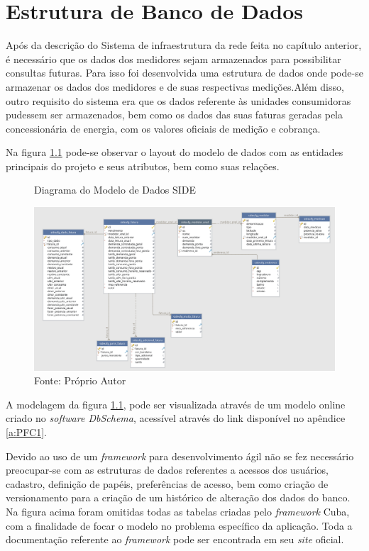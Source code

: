 \chapter{Estrutura de Banco de Dados}
\label{c:estrutura_de_banco_de_dados}
Após da descrição do Sistema de infraestrutura da rede feita no capítulo anterior, é necessário que os dados dos medidores sejam armazenados para possibilitar consultas futuras. Para isso foi desenvolvida uma estrutura de dados onde pode-se armazenar os dados dos medidores e de suas respectivas medições.Além disso, outro requisito do sistema era que os dados referente às unidades consumidoras pudessem ser armazenados, bem como os dados das suas faturas geradas pela concessionária de energia, com os valores oficiais de medição e cobrança.

Na figura \ref{fig:diagrama-modelo-dados} pode-se observar o layout do modelo de dados com as entidades principais do projeto e seus atributos, bem como suas relações.

\begin{figure}[H]
    \centering
    \caption{Diagrama do Modelo de Dados SIDE}
\includegraphics[width=\linewidth]{imagens/modelo-de-dados-side.png}
    \caption*{Fonte: Próprio Autor}
    \label{fig:diagrama-modelo-dados}
\end{figure}

A modelagem da figura \ref{fig:diagrama-modelo-dados}, pode ser visualizada através de um modelo online criado no \textit{software DbSchema}, acessível através do link disponível no apêndice \ref{a:PFC1}.


Devido ao uso de um \textit{framework} para desenvolvimento ágil não se fez necessário preocupar-se com as estruturas de dados referentes a acessos dos usuários, cadastro, definição de papéis, preferências de acesso, bem como criação de versionamento para a criação de um histórico de alteração dos dados do banco. Na figura acima foram omitidas todas as tabelas criadas pelo \textit{framework} Cuba, com a finalidade de focar o modelo no problema específico da aplicação. Toda a documentação referente ao \textit{framework} pode ser encontrada em seu \textit{site} oficial.

